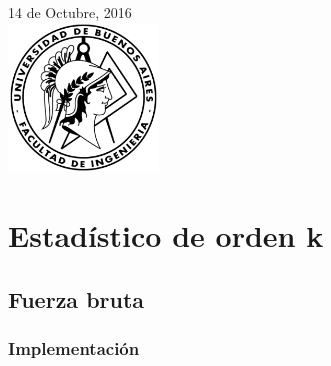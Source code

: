 \begin{titlepage}


{\large 14 de Octubre, 2016}\\[1cm] %


\includegraphics[width=0.3\textwidth]{FIUBA.png}\\[0.8cm] %
 

\vfill %

\end{titlepage}

\tableofcontents
\newpage

\section{Estadístico de orden k}

\subsection{Fuerza bruta}
\subsubsection{Implementación}


